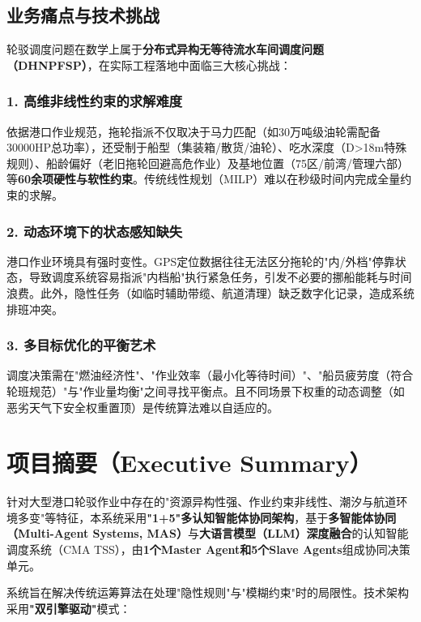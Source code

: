 \documentclass[12pt,a4paper]{article}
\begin{document}
\subsection{业务痛点与技术挑战}

轮驳调度问题在数学上属于\textbf{分布式异构无等待流水车间调度问题（DHNPFSP）}，在实际工程落地中面临三大核心挑战：

\subsubsection{1. 高维非线性约束的求解难度}

依据港口作业规范，拖轮指派不仅取决于马力匹配（如30万吨级油轮需配备30000HP总功率），还受制于船型（集装箱/散货/油轮）、吃水深度（D>18m特殊规则）、船龄偏好（老旧拖轮回避高危作业）及基地位置（75区/前湾/管理六部）等\textbf{60余项硬性与软性约束}。传统线性规划（MILP）难以在秒级时间内完成全量约束的求解。

\subsubsection{2. 动态环境下的状态感知缺失}

港口作业环境具有强时变性。GPS定位数据往往无法区分拖轮的"内/外档"停靠状态，导致调度系统容易指派"内档船"执行紧急任务，引发不必要的挪船能耗与时间浪费。此外，隐性任务（如临时辅助带缆、航道清理）缺乏数字化记录，造成系统排班冲突。

\subsubsection{3. 多目标优化的平衡艺术}

调度决策需在"燃油经济性"、"作业效率（最小化等待时间）"、"船员疲劳度（符合轮班规范）"与"作业量均衡"之间寻找平衡点。且不同场景下权重的动态调整（如恶劣天气下安全权重置顶）是传统算法难以自适应的。

\section{项目摘要（Executive Summary）}

针对大型港口轮驳作业中存在的"资源异构性强、作业约束非线性、潮汐与航道环境多变"等特征，本系统采用\textbf{"1+5"多认知智能体协同架构}，基于\textbf{多智能体协同（Multi-Agent Systems, MAS）}与\textbf{大语言模型（LLM）深度融合}的认知智能调度系统（CMA TSS），由\textbf{1个Master Agent和5个Slave Agents}组成协同决策单元。

系统旨在解决传统运筹算法在处理"隐性规则"与"模糊约束"时的局限性。技术架构采用\textbf{"双引擎驱动"}模式：
\end{document}
